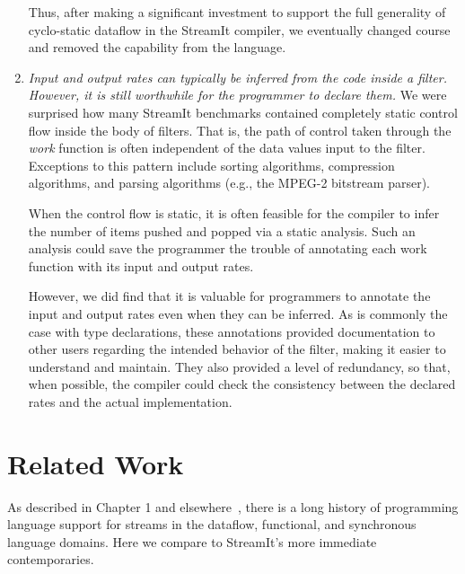 \begin{enumerate}
  Thus, after making a significant investment to support the full
  generality of cyclo-static dataflow in the StreamIt compiler, we
  eventually changed course and removed the capability from the
  language.

\item {\it Input and output rates can typically be inferred from the
  code inside a filter.  However, it is still worthwhile for the
  programmer to declare them.}  We were surprised how many StreamIt
  benchmarks contained completely static control flow inside the body
  of filters.  That is, the path of control taken through the {\it
    work} function is often independent of the data values input to
  the filter.  Exceptions to this pattern include sorting algorithms,
  compression algorithms, and parsing algorithms (e.g., the MPEG-2
  bitstream parser).

  When the control flow is static, it is often feasible for the
  compiler to infer the number of items pushed and popped via a static
  analysis.  Such an analysis could save the programmer the trouble of
  annotating each work function with its input and output rates.

  However, we did find that it is valuable for programmers to annotate
  the input and output rates even when they can be inferred.  As is
  commonly the case with type declarations, these annotations provided
  documentation to other users regarding the intended behavior of the
  filter, making it easier to understand and maintain.  They also
  provided a level of redundancy, so that, when possible, the compiler
  could check the consistency between the declared rates and the
  actual implementation.

\end{enumerate}

\section{Related Work}
\label{sec:lang-related}

As described in Chapter 1 and elsewhere~\cite{stephens_survey_1997}, there is a
long history of programming language support for streams in the
dataflow, functional, and synchronous language domains.  Here we
compare to StreamIt's more immediate contemporaries.

